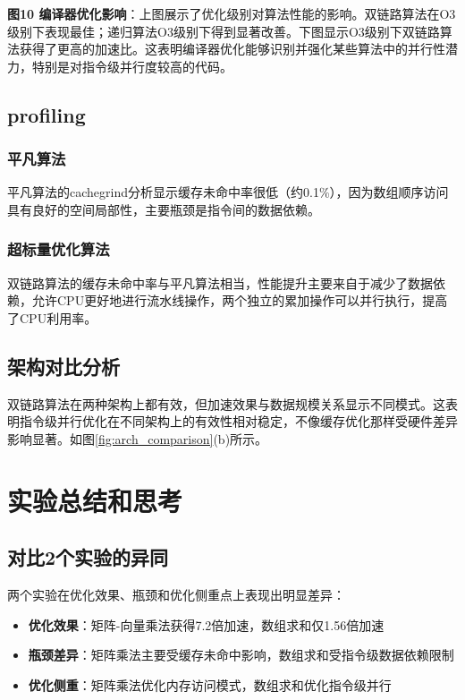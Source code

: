 \documentclass[a4paper,colorlinks=true,linkcolor=blue,urlcolor=blue,citecolor=green,bookmarks=true]{article}
\begin{document}
\textbf{图10 编译器优化影响}：上图展示了优化级别对算法性能的影响。双链路算法在O3级别下表现最佳；递归算法O3级别下得到显著改善。下图显示O3级别下双链路算法获得了更高的加速比。这表明编译器优化能够识别并强化某些算法中的并行性潜力，特别是对指令级并行度较高的代码。

\subsection{profiling}

\subsubsection{平凡算法}

平凡算法的cachegrind分析显示缓存未命中率很低（约0.1\%），因为数组顺序访问具有良好的空间局部性，主要瓶颈是指令间的数据依赖。

\subsubsection{超标量优化算法}

双链路算法的缓存未命中率与平凡算法相当，性能提升主要来自于减少了数据依赖，允许CPU更好地进行流水线操作，两个独立的累加操作可以并行执行，提高了CPU利用率。

\subsection{架构对比分析}

双链路算法在两种架构上都有效，但加速效果与数据规模关系显示不同模式。这表明指令级并行优化在不同架构上的有效性相对稳定，不像缓存优化那样受硬件差异影响显著。如图\ref{fig:arch_comparison}(b)所示。

\section{实验总结和思考}

\subsection{对比2个实验的异同}

两个实验在优化效果、瓶颈和优化侧重点上表现出明显差异：
\begin{itemize}
  \item \textbf{优化效果}：矩阵-向量乘法获得7.2倍加速，数组求和仅1.56倍加速
  \item \textbf{瓶颈差异}：矩阵乘法主要受缓存未命中影响，数组求和受指令级数据依赖限制
  \item \textbf{优化侧重}：矩阵乘法优化内存访问模式，数组求和优化指令级并行
\end{itemize}
\end{document}
